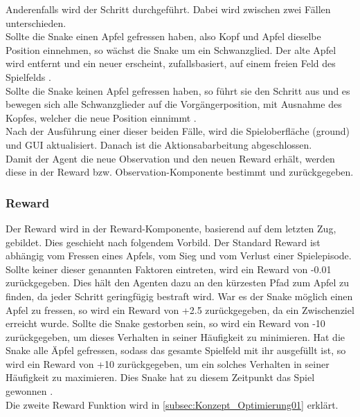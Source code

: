 Anderenfalls wird der Schritt durchgeführt. Dabei wird zwischen zwei Fällen unterschieden.\\
Sollte die Snake einen Apfel gefressen haben, also Kopf und Apfel dieselbe Position einnehmen, so wächst die Snake um ein Schwanzglied. Der alte Apfel wird entfernt und ein neuer erscheint, zufallsbasiert, auf einem freien Feld des Spielfelds .\\
Sollte die Snake keinen Apfel gefressen haben, so führt sie den Schritt aus und es bewegen sich alle Schwanzglieder auf die Vorgängerposition, mit Ausnahme des Kopfes, welcher die neue Position einnimmt .\\
Nach der Ausführung einer dieser beiden Fälle, wird die Spieloberfläche (ground) und GUI aktualisiert. Danach ist die Aktionsabarbeitung abgeschlossen.\\
Damit der Agent die neue Observation und den neuen Reward erhält, werden diese in der Reward bzw. Observation-Komponente bestimmt und zurückgegeben.

\subsubsection{Reward} \label{subsubsec:Konzept_Reward}
Der Reward wird in der Reward-Komponente, basierend auf dem letzten Zug, gebildet. Dies geschieht nach folgendem Vorbild.
Der Standard Reward ist abhängig vom Fressen eines Apfels, vom Sieg und vom Verlust einer Spielepisode. Sollte keiner dieser genannten Faktoren eintreten, wird ein Reward von -0.01 zurückgegeben. Dies hält den Agenten dazu an den kürzesten Pfad zum Apfel zu finden, da jeder Schritt geringfügig bestraft wird.
War es der Snake möglich einen Apfel zu fressen, so wird ein Reward von +2.5 zurückgegeben, da ein Zwischenziel erreicht wurde.
Sollte die Snake gestorben sein, so wird ein Reward von -10 zurückgegeben, um dieses Verhalten in seiner Häufigkeit zu minimieren.
Hat die Snake alle Äpfel gefressen, sodass das gesamte Spielfeld mit ihr ausgefüllt ist, so wird ein Reward von +10 zurückgegeben, um ein solches Verhalten in seiner Häufigkeit zu maximieren. Dies Snake hat zu diesem Zeitpunkt das Spiel gewonnen .\\
Die zweite Reward Funktion wird in \autoref{subsec:Konzept_Optimierung01} erklärt.

